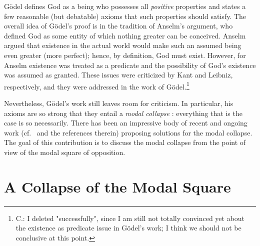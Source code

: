 \documentclass{birkjour}
\theoremstyle{definition}
\theoremstyle{remark}
\numberwithin{equation}{section}
\begin{document}


G\"{o}del defines God as a being who possesses all \emph{positive}
properties and states a few reasonable (but debatable) axioms that
such properties should satisfy.  The overall idea of G{\"o}del's proof
is in the tradition of Anselm's argument, who defined God as some
entity of which nothing greater can be conceived. Anselm argued that
existence in the actual world would make such an assumed being even
greater (more perfect); hence, by definition, God must exist. However,
for Anselm existence was treated as a predicate and the possibility of
God's existence was assumed as granted. These issues were criticized
by Kant and Leibniz, respectively, and they were addressed in the work
of G\"odel.\footnote{C.: I deleted "successfully", since I am still
  not totally convinced yet about the existence as predicate issue in
  G\"odel's work; I think we should not be conclusive at this point.}

Nevertheless, G{\"o}del's work still leaves room for criticism. In
particular, his axioms are so strong that they entail a \emph{modal
  collapse} \cite{Sobel1987,sobel2004logic}: everything that is the
case is so necessarily.  There has been an impressive body of recent
and ongoing work
(cf.~\cite{sobel2004logic,Fitting,anderson90:_some_emend_of_goedel_ontol_proof,AndersonGettings,bjordal99,fuhrmann05:_exist_notwen,Hajek2002,Hajek2008,ContemporaryBibliography}
and the references therein) proposing solutions for the modal
collapse.  The goal of this contribution is to discuss the modal
collapse from the point of view of the modal square of opposition.


\section{A Collapse of the Modal Square}
\end{document}
